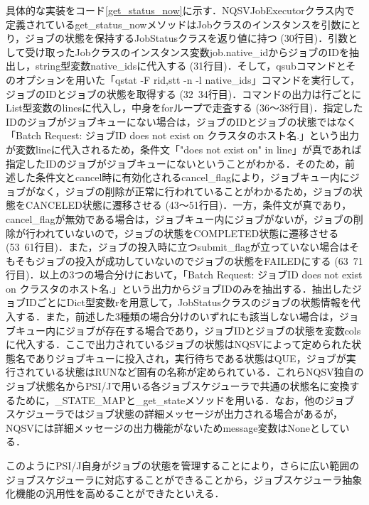 具体的な実装をコード\ref{get_status_now}に示す．NQSVJobExecutorクラス内で定義されているget\_status\_nowメソッドはJobクラスのインスタンスを引数にとり，ジョブの状態を保持するJobStatusクラスを返り値に持つ (30行目)．引数として受け取ったJobクラスのインスタンス変数job.native\_idからジョブのIDを抽出し，string型変数native\_idsに代入する (31行目)．そして，qsubコマンドとそのオプションを用いた「qstat -F rid,stt -n -l native\_ids」コマンドを実行して，ジョブのIDとジョブの状態を取得する (32~34行目)\cite{nqsv_reference}．コマンドの出力は行ごとにList型変数のlinesに代入し，中身をforループで走査する (36～38行目)．指定したIDのジョブがジョブキューにない場合は，ジョブのIDとジョブの状態ではなく「Batch Request: ジョブID does not exist on クラスタのホスト名.」という出力が変数lineに代入されるため，条件文「"does not exist on" in line」が真であれば指定したIDのジョブがジョブキューにないということがわかる．そのため，前述した条件文とcancel時に有効化されるcancel\_flagにより，ジョブキュー内にジョブがなく，ジョブの削除が正常に行われていることがわかるため，ジョブの状態をCANCELED状態に遷移させる (43～51行目)．一方，条件文が真であり，cancel\_flagが無効である場合は，ジョブキュー内にジョブがないが，ジョブの削除が行われていないので，ジョブの状態をCOMPLETED状態に遷移させる (53~61行目)．また，ジョブの投入時に立つsubmit\_flagが立っていない場合はそもそもジョブの投入が成功していないのでジョブの状態をFAILEDにする (63~71行目)．以上の3つの場合分けにおいて，「Batch Request: ジョブID does not exist on クラスタのホスト名.」という出力からジョブIDのみを抽出する．抽出したジョブIDごとにDict型変数rを用意して，JobStatusクラスのジョブの状態情報を代入する．また，前述した3種類の場合分けのいずれにも該当しない場合は，ジョブキュー内にジョブが存在する場合であり，ジョブIDとジョブの状態を変数colsに代入する．ここで出力されているジョブの状態はNQSVによって定められた状態名でありジョブキューに投入され，実行待ちである状態はQUE，ジョブが実行されている状態はRUNなど固有の名称が定められている．これらNQSV独自のジョブ状態名からPSI/Jで用いる各ジョブスケジューラで共通の状態名に変換するために，\_STATE\_MAPと\_get\_stateメソッドを用いる．なお，他のジョブスケジューラではジョブ状態の詳細メッセージが出力される場合があるが，NQSVには詳細メッセージの出力機能がないためmessage変数はNoneとしている．\par
このようにPSI/J自身がジョブの状態を管理することにより，さらに広い範囲のジョブスケジューラに対応することができることから，ジョブスケジューラ抽象化機能の汎用性を高めることができたといえる．\par

